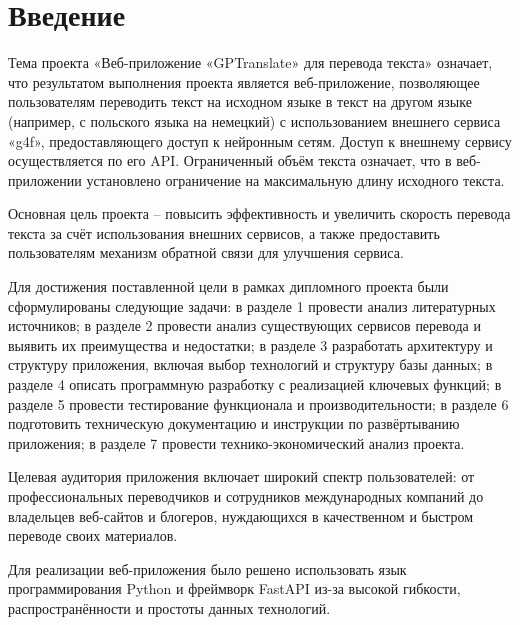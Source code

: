 \clearpage
\section*{Введение}

Тема проекта «Веб-приложение «GPTranslate» для перевода текста» означает, что результатом выполнения проекта является веб-приложение, позволяющее пользователям переводить текст на исходном языке в текст на другом языке (например, с польского языка на немецкий) с использованием внешнего сервиса «g4f», предоставляющего доступ к нейронным сетям. Доступ к внешнему сервису осуществляется по его API. Ограниченный объём текста означает, что в веб-приложении установлено ограничение на максимальную длину исходного текста.

Основная цель проекта – повысить эффективность и увеличить скорость перевода текста за счёт использования внешних сервисов, а также предоставить пользователям механизм обратной связи для улучшения сервиса.

Для достижения поставленной цели в рамках дипломного проекта были сформулированы следующие задачи: в разделе 1 провести анализ литературных источников; в разделе 2 провести анализ существующих сервисов перевода и выявить их преимущества и недостатки; в разделе 3 разработать архитектуру и структуру приложения, включая выбор технологий и структуру базы данных; в разделе 4 описать программную разработку с реализацией ключевых функций; в разделе 5 провести тестирование функционала и производительности; в разделе 6 подготовить техническую документацию и инструкции по развёртыванию приложения; в разделе 7 провести технико-экономический анализ проекта.

Целевая аудитория приложения включает широкий спектр пользователей: от профессиональных переводчиков и сотрудников международных компаний до владельцев веб-сайтов и блогеров, нуждающихся в качественном и быстром переводе своих материалов.

Для реализации веб-приложения было решено использовать язык программирования Python и фреймворк FastAPI из-за высокой гибкости, распространённости и простоты данных технологий.
